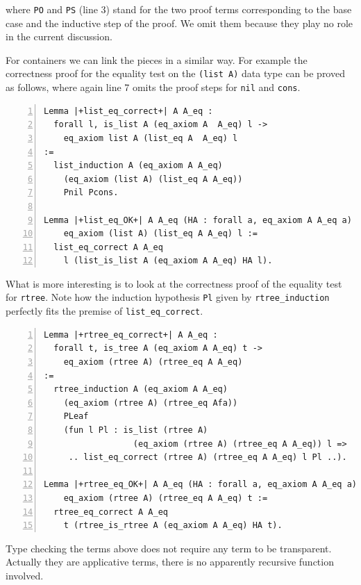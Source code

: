 \documentclass[sigplan,10pt,review]{acmart}\settopmatter{printfolios=true,printccs=false,printacmref=false}
\begin{document}
\noindent
where \lstinline+PO+ and \lstinline+PS+ (line 3) stand for
the two proof terms corresponding to the base case and the inductive
step of the proof. We omit them because they play no role in the
current discussion.

For containers we can link the pieces in a similar way.
For example the correctness proof
for the equality test on the \lstinline+(list A)+ data type can be
proved as follows, where again line 7 omits the proof steps for
\lstinline+nil+ and \lstinline+cons+.

\begin{minipage}{\textwidth}\begin{lstlisting}[numbers=left]
Lemma |+list_eq_correct+| A A_eq :
  forall l, is_list A (eq_axiom A  A_eq) l ->
    eq_axiom list A (list_eq A  A_eq) l
:=
  list_induction A (eq_axiom A A_eq)
    (eq_axiom (list A) (list_eq A A_eq))
    Pnil Pcons.

Lemma |+list_eq_OK+| A A_eq (HA : forall a, eq_axiom A A_eq a) l :
    eq_axiom (list A) (list_eq A A_eq) l :=
  list_eq_correct A A_eq
    l (list_is_list A (eq_axiom A A_eq) HA l).
\end{lstlisting}\end{minipage}

\noindent
What is more interesting is to look at the correctness 
proof of the equality test
for \lstinline+rtree+. Note how the induction hypothesis
\lstinline+Pl+
given by \lstinline+rtree_induction+ perfectly fits
the premise of \lstinline+list_eq_correct+.

\begin{minipage}{\textwidth}\begin{lstlisting}[numbers=left]
Lemma |+rtree_eq_correct+| A A_eq :
  forall t, is_tree A (eq_axiom A A_eq) t ->
    eq_axiom (rtree A) (rtree_eq A A_eq)
:=
  rtree_induction A (eq_axiom A A_eq)
    (eq_axiom (rtree A) (rtree_eq Afa))
    PLeaf
    (fun l Pl : is_list (rtree A) 
                  (eq_axiom (rtree A) (rtree_eq A A_eq)) l =>
     .. list_eq_correct (rtree A) (rtree_eq A A_eq) l Pl ..).

Lemma |+rtree_eq_OK+| A A_eq (HA : forall a, eq_axiom A A_eq a) t :
    eq_axiom (rtree A) (rtree_eq A A_eq) t :=
  rtree_eq_correct A A_eq
    t (rtree_is_rtree A (eq_axiom A A_eq) HA t).
\end{lstlisting}\end{minipage}

Type checking the terms above does not require any term to be
transparent. Actually they are applicative terms, there is no
apparently recursive function involved.
\end{document}
